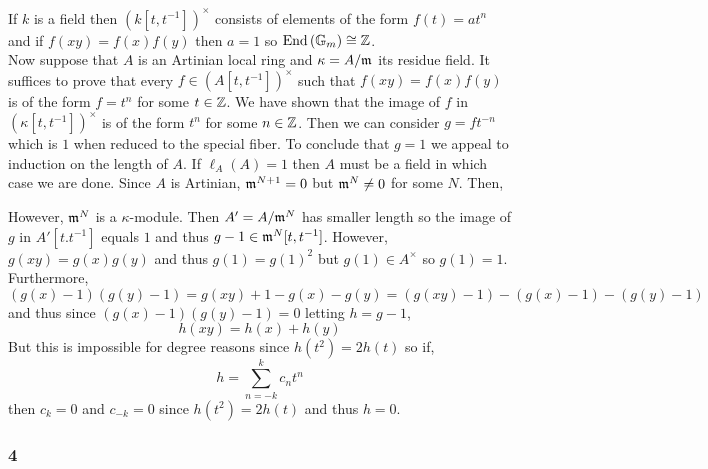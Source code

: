 \documentclass[12pt]{article}
\begin{document}
If $k$ is a field then $(k[t, t^{-1}])^\times$ consists of elements of the form $f(t) = a t^n$ and if $f(xy) = f(x) f(y)$ then $a = 1$ so $\mathrm{End} \left( \mathbb{G}_m \right) \cong \mathbb{Z}$.
\bigskip\\
Now suppose that $A$ is an Artinian local ring and $\kappa = A / \mathfrak{m}$ its residue field. It suffices to prove that every $f \in (A[t, t^{-1}])^\times$ such that $f(xy) = f(x) f(y)$ is of the form $f = t^n$ for some $t \in \mathbb{Z}$. We have shown that the image of $f$ in $(\kappa[t, t^{-1}])^\times$ is of the form $t^{n}$ for some $n \in \mathbb{Z}$. Then we can consider $g = f t^{-n}$ which is $1$ when reduced to the special fiber. To conclude that $g = 1$ we appeal to induction on the length of $A$. If $\ell_A(A) = 1$ then $A$ must be a field in which case we are done. Since $A$ is Artinian, $\mathfrak{m}^{N+1} = 0$ but $\mathfrak{m}^N \neq 0$ for some $N$. Then,
\begin{center}
\end{center}
However, $\mathfrak{m}^{N}$ is a $\kappa$-module. Then $A' = A / \mathfrak{m}^{N}$ has smaller length so the image of $g$ in $A'[t. t^{-1}]$ equals $1$ and thus $g - 1 \in \mathfrak{m}^{N}[t, t^{-1}]$. However, $g(xy) = g(x)g(y)$ and thus $g(1) = g(1)^2$ but $g(1) \in A^\times$ so $g(1) = 1$. Furthermore, 
\[ (g(x) - 1)(g(y) - 1) = g(xy) + 1 - g(x) - g(y) = (g(xy) - 1) - (g(x) - 1) - (g(y) - 1) \]
and thus since $(g(x) - 1)(g(y) - 1) = 0$ letting $h = g - 1$,
\[ h(xy) = h(x) + h(y) \]
But this is impossible for degree reasons since $h(t^2) = 2 h(t)$ so if,
\[ h = \sum_{n = -k}^k c_n t^n \]
then $c_k = 0$ and $c_{-k} = 0$ since $h(t^2) = 2 h(t)$ and thus $h = 0$.

\subsubsection{4}
\end{document}
